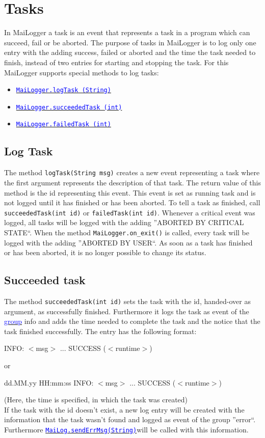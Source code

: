 \documentclass{article}
\newcommand{\refh}[2]{\hyperref[#1] {\textcolor{blue}{#2}}}
\newcommand{\logTask}{\refh{tasks_logTask}{\lstinline|MaiLogger.logTask (String)|}}
\newcommand{\succeededTask}{\refh{tasks_succeededTask}{\lstinline|MaiLogger.succeededTask (int)|}}
\newcommand{\failedTask}{\refh{tasks_failedTask}{\lstinline|MaiLogger.failedTask (int)|}}
\newcommand{\sendErr}{\refh{setup_interface}{\lstinline|MaiLog.sendErrMsg(String)|}}
\begin{document}
\section{Tasks}
\label{tasks}
    In MaiLogger a task is an event that represents a task in a program which can succeed, fail or be aborted.
    The purpose of tasks in MaiLogger is to log only one entry with the adding success, failed or aborted and the time the task needed to finish, instead of two entries for starting and stopping the task.
    For this MaiLogger supports special methods to log tasks:
    \begin{itemize}
        \item \logTask
        \item \succeededTask
        \item \failedTask
    \end{itemize}

    \subsection{Log Task}
    \label{tasks_logTask}
    The method \lstinline|logTask(String msg)| creates a new event representing a task where the first argument represents the description of that task.
    The return value of this method is the id representing this event.
    This event is set as running task and is not logged until it has finished or has been aborted.
    To tell a task as finished, call \lstinline|succeededTask(int id)| or \lstinline|failedTask(int id)|.
    Whenever a critical event was logged, all tasks will be logged with the adding ''ABORTED BY CRITICAL STATE``.
    When the method \lstinline|MaiLogger.on_exit()| is called, every task will be logged with the adding ''ABORTED BY USER``.
    As soon as a task has finished or has been aborted, it is no longer possible to change its status.

    \subsection{Succeeded task}
    \label{tasks_succeededTask}
    The method \lstinline|succeededTask(int id)| sets the task with the id, handed-over as argument, as successfully finished.
    Furthermore it logs the task as event of the \refh{logging_groups}{group} info and adds the time needed to complete the task and the notice that the task finished successfully.
    The entry has the following format:
    \begin{description}
        \item INFO: $<$msg$>$ ... SUCCESS ($<$runtime$>$)
        \item or
        \item dd.MM.yy HH:mm:ss INFO: $<$msg$>$ ... SUCCESS ($<$runtime$>$)
    \end{description}
    (Here, the time is specified, in which the task was created) \\
    If the task with the id doesn't exist, a new log entry will be created with the information that the task wasn't found and logged as event of the group ''error``.
    Furthermore \sendErr will be called with this information.
\end{document}
